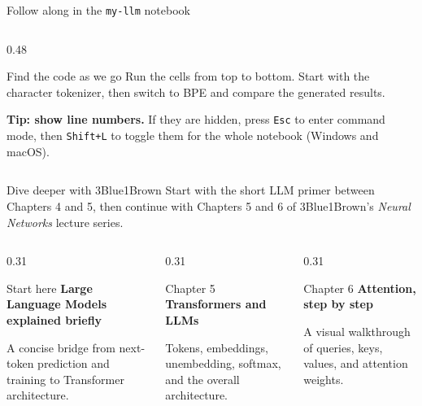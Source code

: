 \documentclass[aspectratio=169]{beamer}
\begin{document}
\begin{frame}{Follow along in the \texttt{my-llm} notebook}
\begin{columns}[T]
\begin{column}{0.48\textwidth}
\begin{block}{Find the code as we go}
        \footnotesize
        Run the cells from top to bottom. Start with the character tokenizer,
        then switch to BPE and compare the generated results.

        \smallskip
        \textbf{Tip: show line numbers.} If they are hidden, press
        \texttt{Esc} to enter command mode, then \texttt{Shift+L} to toggle
        them for the whole notebook (Windows and macOS).
      \end{block}
    \end{column}
  \end{columns}
\end{frame}





\begin{frame}{Dive deeper with 3Blue1Brown}
  \small
  Start with the short LLM primer between Chapters 4 and 5, then continue with
  Chapters 5 and 6 of 3Blue1Brown's \emph{Neural Networks} lecture series.

  \vspace{0.5em}
  \begin{columns}[T]
    \begin{column}{0.31\textwidth}
      \begin{block}{Start here}
        \centering
        \textbf{Large Language Models explained briefly}

        \smallskip
        \footnotesize
        A concise bridge from next-token prediction and training to
        Transformer architecture.
      \end{block}
    \end{column}
    \begin{column}{0.31\textwidth}
      \begin{block}{Chapter 5}
        \centering
        \textbf{Transformers and LLMs}

        \smallskip
        \footnotesize
        Tokens, embeddings, unembedding, softmax, and the overall architecture.
      \end{block}
    \end{column}
    \begin{column}{0.31\textwidth}
      \begin{block}{Chapter 6}
        \centering
        \textbf{Attention, step by step}

        \smallskip
        \footnotesize
        A visual walkthrough of queries, keys, values, and attention weights.
      \end{block}
    \end{column}
  \end{columns}


\end{frame}
\end{document}
